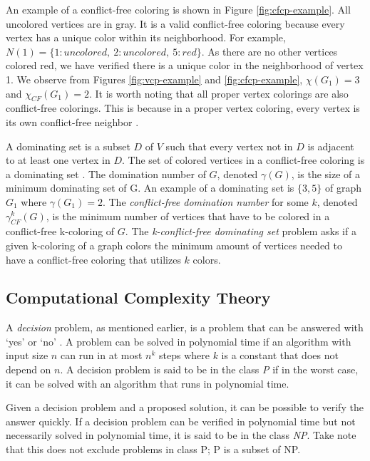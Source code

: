 \documentclass{sig-alternate}
\begin{document}
An example of a conflict-free coloring is shown in Figure \ref{fig:cfcp-example}. All uncolored vertices are in gray. It is a valid conflict-free coloring because every vertex has a unique color within its neighborhood. For example, $N(1) = \{1: uncolored,\ 2: uncolored,\ 5: red\}$. As there are no other vertices colored red, we have verified there is a unique color in the neighborhood of vertex 1. We observe from Figures \ref{fig:vcp-example} and \ref{fig:cfcp-example}, $\chi(G_1) = 3$ and $\chi_{CF}(G_1) = 2$. It is worth noting that all proper vertex colorings are also conflict-free colorings. This is because in a proper vertex coloring, every vertex is its own conflict-free neighbor \cite{abel2017three}.

A dominating set is a subset $D$ of $V$ such that every vertex not in $D$ is adjacent to at least one vertex in $D$. The set of colored vertices in a conflict-free coloring is a dominating set \cite{abel2017three}. The domination number of $G$, denoted $\gamma(G)$, is the size of a minimum dominating set of G. An example of a dominating set is $\{3, 5\}$ of graph $G_1$ where $\gamma(G_1) = 2$. The \emph{conflict-free domination number} for some $k$, denoted $\gamma_{CF}^k(G)$, is the minimum number of vertices that have to be colored in a conflict-free k-coloring of $G$. The \emph{k-conflict-free dominating set} problem asks if a given k-coloring of a graph colors the minimum amount of vertices needed to have a conflict-free coloring that utilizes $k$ colors.

\subsection{Computational Complexity Theory}
\label{sec:complexitytheory}
A \emph{decision} problem, as mentioned earlier, is a problem that can be answered with `yes' or `no' \cite{sipser2006introduction}. A problem can be solved in polynomial time if an algorithm with input size $n$ can run in at most $n^k$ steps where $k$ is a constant that does not depend on $n$. A decision problem is said to be in the class \emph{P} if in the worst case, it can be solved with an algorithm that runs in polynomial time.

Given a decision problem and a proposed solution, it can be possible to verify the answer quickly. If a decision problem can be verified in polynomial time but not necessarily solved in polynomial time, it is said to be in the class \emph{NP}. Take note that this does not exclude problems in class P; P is a subset of NP.
\end{document}
